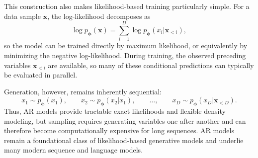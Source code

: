 This construction also makes likelihood-based training particularly simple.
For a data sample $\mathbf{x}$, the log-likelihood decomposes as
\begin{equation*}
    \log p_{\bm{\phi}}(\mathbf{x})
    =
    \sum_{i=1}^{D}
    \log p_{\bm{\phi}}(x_i|\mathbf{x}_{<i}),
\end{equation*}
so the model can be trained directly by maximum likelihood, or equivalently by minimizing the negative log-likelihood.
During training, the observed preceding variables $\mathbf{x}_{<i}$ are available, so many of these conditional predictions can typically be evaluated in parallel.

Generation, however, remains inherently sequential:
\begin{equation*}
    x_1 \sim p_{\bm{\phi}}(x_1),
    \qquad
    x_2 \sim p_{\bm{\phi}}(x_2| x_1),
    \qquad
    \ldots,
    \qquad
    x_D \sim p_{\bm{\phi}}(x_D|\mathbf{x}_{<D}).
\end{equation*}
Thus, AR models provide tractable exact likelihoods and flexible density modeling, but sampling requires generating variables one after another and can therefore become computationally expensive for long sequences. AR models remain a foundational class of likelihood-based generative models and underlie many modern sequence and language models.





